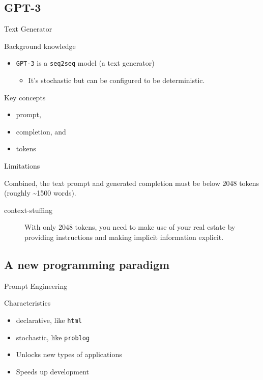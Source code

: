 \documentclass[presentation]{beamer}
\begin{document}
\subsection{GPT-3}
\label{sec:org4d7aee5}
\begin{frame}[label={sec:orga8f00d3},fragile]{Text Generator}
 \begin{block}{Background knowledge}
{\footnotesize
\begin{itemize}
\item \texttt{GPT-3} is a \texttt{seq2seq} model (a text generator)
\begin{itemize}
\item It's stochastic but can be configured to be deterministic.
\end{itemize}
\end{itemize}
}
\end{block}

\begin{block}{Key concepts}
{\footnotesize
\begin{itemize}
\item prompt,
\item completion, and
\item tokens
\end{itemize}
}
\end{block}

\begin{block}{Limitations}
{\footnotesize
Combined, the text prompt and generated
completion must be below 2048 tokens (roughly
\textasciitilde{}1500 words).

\begin{description}
\item[{context-stuffing}] With only 2048 tokens, you need to make
use of your real estate by providing
instructions and making implicit
information explicit.
\end{description}
}
\end{block}
\end{frame}

\subsection{A new programming paradigm}
\label{sec:org8450b27}
\begin{frame}[label={sec:orgf01dda3},fragile]{Prompt Engineering}
 \begin{block}{Characteristics}
{\footnotesize
\begin{itemize}
\item declarative, like \texttt{html}
\item stochastic, like \texttt{problog}
\item Unlocks new types of applications
\item Speeds up development
\end{itemize}
}
\end{block}
\end{frame}
\end{document}
